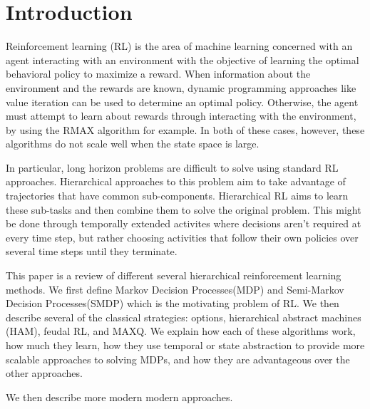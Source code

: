 \section{Introduction}

Reinforcement learning (RL) is the area of machine learning concerned with an agent interacting with an environment with the objective of learning the optimal behavioral policy to maximize a reward. When information about the environment and the rewards are known, dynamic programming approaches like value iteration can be used to determine an optimal policy. Otherwise, the agent must attempt to learn about rewards through interacting with the environment, by using the RMAX algorithm for example. In both of these cases, however, these algorithms do not scale well when the state space is large. 

In particular, long horizon problems are difficult to solve using standard RL approaches. Hierarchical approaches to this problem aim to take advantage of trajectories that have common sub-components. Hierarchical RL aims to learn these sub-tasks and then combine them to solve the original problem. This might be done through temporally extended activites where decisions aren't required at every time step, but rather choosing activities that follow their own policies over several time steps until they terminate. 

This paper is a review of different several hierarchical reinforcement learning methods. We first define Markov Decision Processes(MDP) and Semi-Markov Decision Processes(SMDP) which is the motivating problem of RL. We then describe several of the classical strategies: options, hierarchical abstract machines (HAM), feudal RL, and MAXQ. We explain how each of these algorithms work, how much they learn, how they use temporal or state abstraction to provide more scalable approaches to solving MDPs, and how they are advantageous over the other approaches. 

We then describe more modern modern approaches. 

